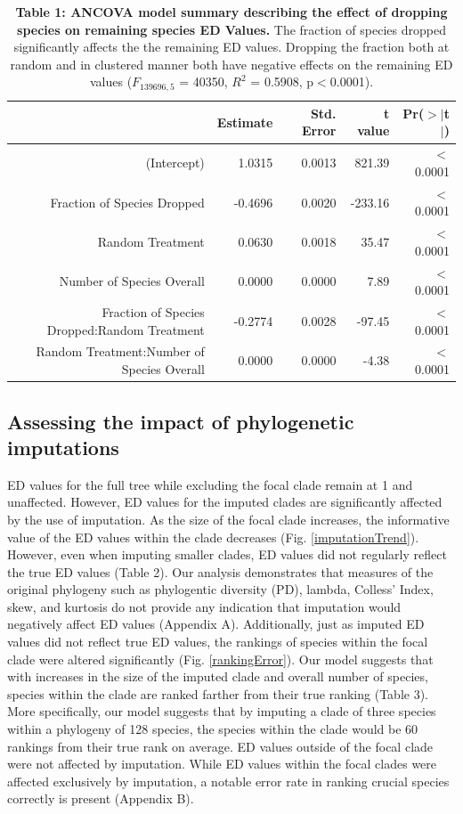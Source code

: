 \documentclass[12pt,english]{article}
\begin{document}
\begin{table}[ht]
  \centering
  \begin{tabular}{rrrrr}
    \hline
   & Estimate & Std. Error & t value & Pr($>$$|$t$|$) \\
    \hline
  (Intercept) & 1.0315 & 0.0013 & 821.39 & $<$0.0001 \\
    Fraction of Species Dropped & -0.4696 & 0.0020 & -233.16 & $<$0.0001 \\
    Random Treatment & 0.0630 & 0.0018 & 35.47 & $<$0.0001 \\
    Number of Species Overall & 0.0000 & 0.0000 & 7.89 & $<$0.0001 \\
    Fraction of Species Dropped:Random Treatment & -0.2774 & 0.0028 & -97.45 & $<$0.0001 \\
    Random Treatment:Number of Species Overall & 0.0000 & 0.0000 & -4.38 & $<$0.0001 \\
     \hline
     \hline
  \end{tabular}
  \caption*{\textbf{Table 1: ANCOVA model summary describing the effect of
  dropping species on remaining species ED Values.} The fraction of species
  dropped significantly affects the the remaining ED values. Dropping the
  fraction both at random and in clustered manner both have negative effects on
  the remaining ED values ($F_{139696, 5}$ = 40350, $R^{2}$ = 0.5908,
  p$<$0.0001).}
  \end{table}

\subsection*{Assessing the impact of phylogenetic imputations}

ED values for the full tree while excluding the focal clade remain at 1 and
unaffected. However, ED values for the imputed clades are significantly
affected by the use of imputation. As the size of the focal clade increases,
the informative value of the ED values within the clade decreases (Fig.
\ref{imputationTrend}). However, even when imputing smaller clades, ED values
did not regularly reflect the true ED values (Table 2). Our analysis
demonstrates that measures of the original phylogeny such as phylogentic
diversity (PD), lambda, Colless' Index, skew, and kurtosis do not provide any
indication that imputation would negatively affect ED values (Appendix A).
Additionally, just as imputed ED values did not reflect true ED values, the
rankings of species within the focal clade were altered significantly (Fig.
\ref{rankingError}). Our model suggests that with increases in the size of the
imputed clade and overall number of species, species within the clade are
ranked farther from their true ranking (Table 3). More specifically, our model
suggests that by imputing a clade of three species within a phylogeny of 128
species, the species within the clade would be 60 rankings from their true rank
on average. ED values outside of the focal clade were not affected by
imputation. While ED values within the focal clades were affected exclusively
by imputation, a notable error rate in ranking crucial species correctly is
present (Appendix B).
\end{document}
